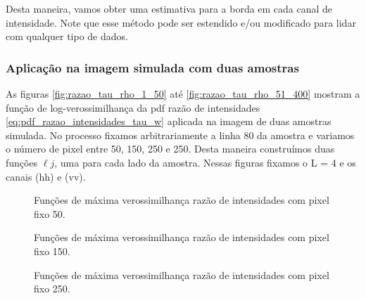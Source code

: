 Desta maneira, vamos obter uma estimativa para a borda em cada canal de intensidade.
Note que esse método pode ser estendido e/ou modificado para lidar com qualquer tipo de dados.

\subsubsection{Aplicação na imagem simulada com duas amostras}


As figuras \eqref{fig:razao_tau_rho_1_50} até \eqref{fig:razao_tau_rho_51_400} mostram a função de log-verossimilhança da pdf razão de intensidades \eqref{eq:pdf_razao_intensidades_tau_w} aplicada na imagem de duas amostras simulada. No processo fixamos arbitrariamente a linha 80 da amostra e variamos o número de pixel entre 50, 150, 250 e 250. Desta maneira construímos duas funções $\ell{j}$, uma para cada lado da amostra. Nessas figuras fixamos o L = 4 e os canais (hh) e (vv).
 \begin{figure*}[hbt]
	\centering
     \caption{Funções de máxima verossimilhança razão de intensidades com pixel fixo 50.}
     \label{fig:razao_l_50_r_80} 
   \end{figure*}
\begin{figure*}[hbt]
	\centering
     \caption{Funções de máxima verossimilhança razão de intensidades com pixel fixo 150.}
     \label{fig:razao_l_150_r_80} 
   \end{figure*}   
   
   \begin{figure*}[hbt]
	\centering
     \caption{Funções de máxima verossimilhança razão de intensidades com pixel fixo 250.}
     \label{fig:razao_l_250_r_80} 
   \end{figure*}   
   

